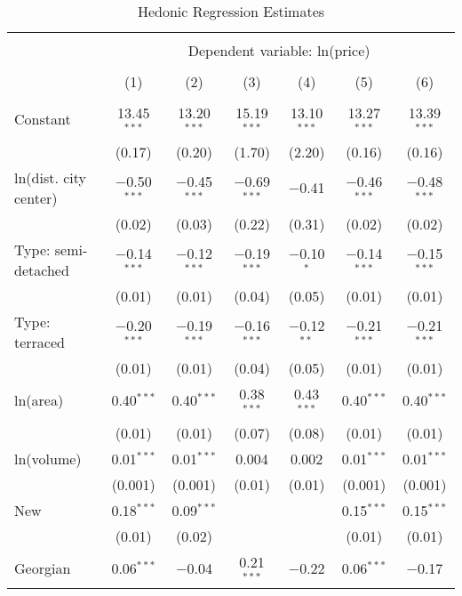 
\begin{table}[!htbp] \centering 
  \caption{Hedonic Regression Estimates} 
  \label{tab:hedreg} 
\footnotesize 
\begin{tabular}{@{\extracolsep{5pt}}lcccccc} 
\\[-1.8ex]\hline 
\hline \\[-1.8ex] 
 & \multicolumn{6}{c}{Dependent variable: ln(price)} \\ 
\cline{2-7} 
\\[-1.8ex] & (1) & (2) & (3) & (4) & (5) & (6)\\ 
\hline \\[-1.8ex] 
 Constant & 13.45$^{***}$ & 13.20$^{***}$ & 15.19$^{***}$ & 13.10$^{***}$ & 13.27$^{***}$ & 13.39$^{***}$ \\ 
  & (0.17) & (0.20) & (1.70) & (2.20) & (0.16) & (0.16) \\ 
  ln(dist. city center) & $-$0.50$^{***}$ & $-$0.45$^{***}$ & $-$0.69$^{***}$ & $-$0.41 & $-$0.46$^{***}$ & $-$0.48$^{***}$ \\ 
  & (0.02) & (0.03) & (0.22) & (0.31) & (0.02) & (0.02) \\ 
  Type: semi-detached & $-$0.14$^{***}$ & $-$0.12$^{***}$ & $-$0.19$^{***}$ & $-$0.10$^{*}$ & $-$0.14$^{***}$ & $-$0.15$^{***}$ \\ 
  & (0.01) & (0.01) & (0.04) & (0.05) & (0.01) & (0.01) \\ 
  Type: terraced & $-$0.20$^{***}$ & $-$0.19$^{***}$ & $-$0.16$^{***}$ & $-$0.12$^{**}$ & $-$0.21$^{***}$ & $-$0.21$^{***}$ \\ 
  & (0.01) & (0.01) & (0.04) & (0.05) & (0.01) & (0.01) \\ 
  ln(area) & 0.40$^{***}$ & 0.40$^{***}$ & 0.38$^{***}$ & 0.43$^{***}$ & 0.40$^{***}$ & 0.40$^{***}$ \\ 
  & (0.01) & (0.01) & (0.07) & (0.08) & (0.01) & (0.01) \\ 
  ln(volume) & 0.01$^{***}$ & 0.01$^{***}$ & 0.004 & 0.002 & 0.01$^{***}$ & 0.01$^{***}$ \\ 
  & (0.001) & (0.001) & (0.01) & (0.01) & (0.001) & (0.001) \\ 
  New & 0.18$^{***}$ & 0.09$^{***}$ &  &  & 0.15$^{***}$ & 0.15$^{***}$ \\ 
  & (0.01) & (0.02) &  &  & (0.01) & (0.01) \\ 
  Georgian & 0.06$^{***}$ & $-$0.04 & 0.21$^{***}$ & $-$0.22 & 0.06$^{***}$ & $-$0.17 \\ 

\end{tabular}
\end{table}
